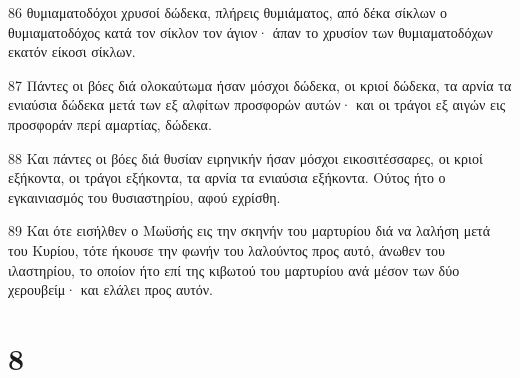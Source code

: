 \par 86 θυμιαματοδόχοι χρυσοί δώδεκα, πλήρεις θυμιάματος, από δέκα σίκλων ο θυμιαματοδόχος κατά τον σίκλον τον άγιον· άπαν το χρυσίον των θυμιαματοδόχων εκατόν είκοσι σίκλων.
\par 87 Πάντες οι βόες διά ολοκαύτωμα ήσαν μόσχοι δώδεκα, οι κριοί δώδεκα, τα αρνία τα ενιαύσια δώδεκα μετά των εξ αλφίτων προσφορών αυτών· και οι τράγοι εξ αιγών εις προσφοράν περί αμαρτίας, δώδεκα.
\par 88 Και πάντες οι βόες διά θυσίαν ειρηνικήν ήσαν μόσχοι εικοσιτέσσαρες, οι κριοί εξήκοντα, οι τράγοι εξήκοντα, τα αρνία τα ενιαύσια εξήκοντα. Ούτος ήτο ο εγκαινιασμός του θυσιαστηρίου, αφού εχρίσθη.
\par 89 Και ότε εισήλθεν ο Μωϋσής εις την σκηνήν του μαρτυρίου διά να λαλήση μετά του Κυρίου, τότε ήκουσε την φωνήν του λαλούντος προς αυτό, άνωθεν του ιλαστηρίου, το οποίον ήτο επί της κιβωτού του μαρτυρίου ανά μέσον των δύο χερουβείμ· και ελάλει προς αυτόν.

\chapter{8}

